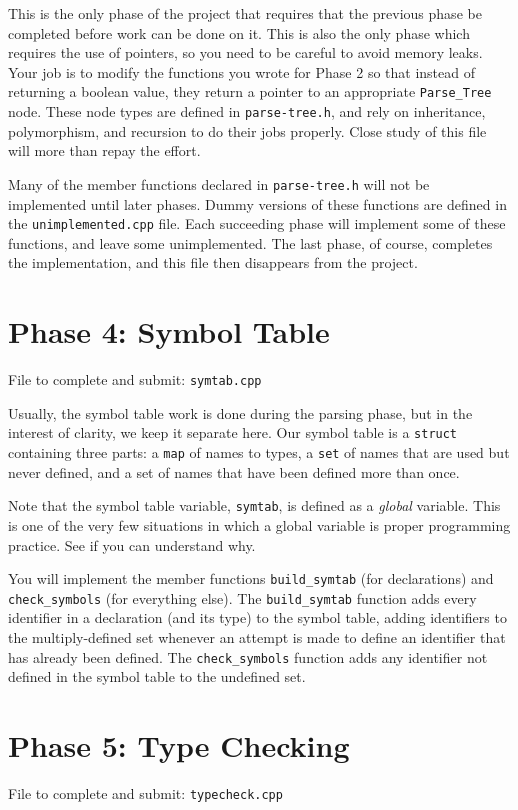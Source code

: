 \documentclass{article}
\begin{document}
This is the only phase of the project that requires that the previous
phase be completed before work can be done on it. This is also the
only phase which requires the use of pointers, so you need to be
careful to avoid memory leaks. Your job is to modify the functions you
wrote for Phase 2 so that instead of returning a boolean value, they
return a pointer to an appropriate \texttt{Parse\_Tree} node. These
node types are defined in \texttt{parse-tree.h}, and rely on
inheritance, polymorphism, and recursion to do their jobs properly.
Close study of this file will more than repay the effort.

Many of the member functions declared in \texttt{parse-tree.h} will
not be implemented until later phases. Dummy versions of these
functions are defined in the \texttt{unimplemented.cpp} file. Each
succeeding phase will implement some of these functions, and leave
some unimplemented. The last phase, of course, completes the
implementation, and this file then disappears from the project.

\section{Phase 4: Symbol Table}
File to complete and submit: \texttt{symtab.cpp}

Usually, the symbol table work is done during the parsing phase, but
in the interest of clarity, we keep it separate here. Our symbol table
is a \texttt{struct} containing three parts: a \texttt{map} of names
to types, a \texttt{set} of names that are used but never defined, and
a set of names that have been defined more than once.

Note that the symbol table variable, \texttt{symtab}, is defined as
a {\em global} variable. This is one of the very few situations in
which a global variable is proper programming practice. See if you can
understand why.

You will implement the member functions \texttt{build\_symtab} (for
declarations) and \texttt{check\_symbols} (for everything else). The
\texttt{build\_symtab} function adds every identifier in a declaration
(and its type) to the symbol table, adding identifiers to the
multiply-defined set whenever an attempt is made to define an
identifier that has already been defined. The \texttt{check\_symbols}
function adds any identifier not defined in the symbol table to the
undefined set.

\section{Phase 5: Type Checking}
File to complete and submit: \texttt{typecheck.cpp}
\end{document}
